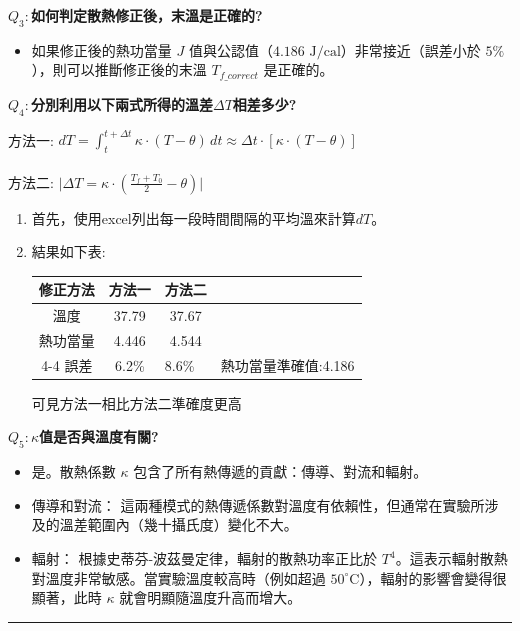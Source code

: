 \documentclass[12pt]{article}
\begin{document}
\vspace*{0.5cm}
\noindent
\textbf{$Q_3:$如何判定散熱修正後，末溫是正確的?}
\begin{itemize}
    \item 如果修正後的熱功當量 $J$ 值與公認值（$4.186 \text{ J/cal}$）非常接近（誤差小於 $5\%$），則可以推斷修正後的末溫 $T_{f\_correct}$ 是正確的。
\end{itemize}
\vspace*{0.5cm}
\noindent
\textbf{$Q_4:$分別利用以下兩式所得的溫差$\Delta T$相差多少?}
\begin{center}
    方法一: $dT=\int_{t}^{t+\Delta t}\kappa\cdot(T-\theta)\,dt\approx \Delta t \cdot [\kappa\cdot(T-\theta)]$\\\\
    
    方法二: $\vert\Delta T=  \kappa\cdot(\frac{T_f+T_0}{2}-\theta) \vert$
\end{center}
\begin{enumerate}
    \item 首先，使用excel列出每一段時間間隔的平均溫來計算$dT$。
    \item 結果如下表:
    \begin{table}[H]
    \centering
    \begin{tabular}{cccc}
    \hline
    修正方法 & 方法一 & 方法二               &                                    \\ \hline
    溫度   & 37.79 & 37.67                      &                                    \\ \hline
    熱功當量 & 4.446 & 4.544                      &                                    \\ \cline{4-4} 
    誤差   & 6.2\% & \multicolumn{1}{l|}{8.6\%} & \multicolumn{1}{l|}{熱功當量準確值:4.186} \\ \hline
    \end{tabular}
    \end{table}
    可見方法一相比方法二準確度更高
\end{enumerate}
\vspace*{0.5cm}
\noindent
\textbf{$Q_5:\kappa$值是否與溫度有關?}
\begin{itemize}
    \item 是。散熱係數 $\kappa$ 包含了所有熱傳遞的貢獻：傳導、對流和輻射。
    \item 傳導和對流： 這兩種模式的熱傳遞係數對溫度有依賴性，但通常在實驗所涉及的溫差範圍內（幾十攝氏度）變化不大。
    \item 輻射： 根據史蒂芬-波茲曼定律，輻射的散熱功率正比於 $T^4$。這表示輻射散熱對溫度非常敏感。當實驗溫度較高時（例如超過 $50^\circ \text{C}$），輻射的影響會變得很顯著，此時 $\kappa$ 就會明顯隨溫度升高而增大。

\end{itemize}

\vspace*{0.5cm}
\hrule
\vspace*{0.5cm}
\end{document}
